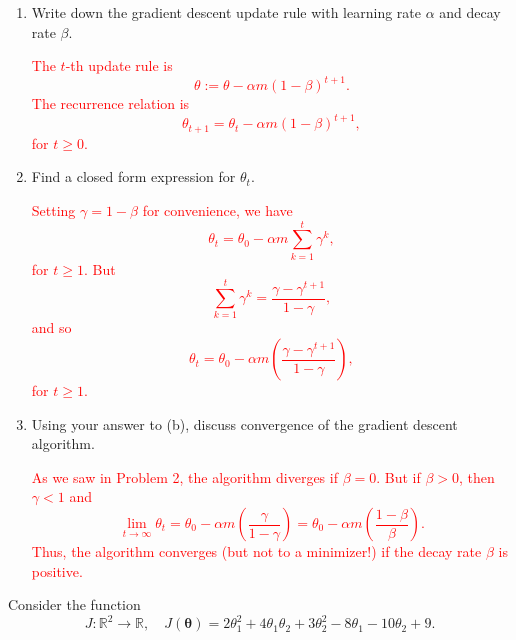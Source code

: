 \documentclass[12pt,reqno]{amsart}
\begin{document}
\medskip
\begin{enumerate}
\item Write down the gradient descent update rule with learning rate $\alpha$ and decay rate $\beta$.

\bigskip
\textcolor{red}{The $t$-th update rule is
	\[\theta := \theta - \alpha m(1-\beta)^{t+1}.
	\]
The recurrence relation is
	\[\theta_{t+1} = \theta_{t} - \alpha m(1-\beta)^{t+1},
	\]
for $t\geq 0$.}
\bigskip

\item Find a closed form expression for $\theta_t$.

\bigskip
\textcolor{red}{Setting $\gamma = 1-\beta$ for convenience, we have
	\[\theta_t = \theta_0 - \alpha m \sum_{k=1}^t \gamma^k,
	\]
for $t\geq 1$. But
	\[\sum_{k=1}^t \gamma^k = \frac{\gamma - \gamma^{t+1}}{1-\gamma},
	\]
and so
	\[\theta_t = \theta_0 - \alpha m \left( \frac{\gamma - \gamma^{t+1}}{1-\gamma}\right),
	\]
for $t\geq 1$.}
\bigskip

\item Using your answer to (b), discuss convergence of the gradient descent algorithm.

\bigskip
\textcolor{red}{As we saw in Problem 2, the algorithm diverges if $\beta=0$. But if $\beta>0$, then $\gamma <1$ and
	\[\lim_{t\to \infty} \theta_t = \theta_0 - \alpha m \left( \frac{\gamma}{1-\gamma} \right) = \theta_0 - \alpha m \left( \frac{1-\beta}{\beta} \right).
	\]
Thus, the algorithm converges (but not to a minimizer!) if the decay rate $\beta$ is positive.}
\bigskip
\end{enumerate}











\prob Consider the function
	\[J: \mathbb{R}^2 \to \mathbb{R}, \quad J(\boldsymbol{\theta}) = 2\theta_1^2 + 4\theta_1\theta_2 + 3\theta_2^2 -8\theta_1 - 10\theta_2 + 9.
	\]
\end{document}
